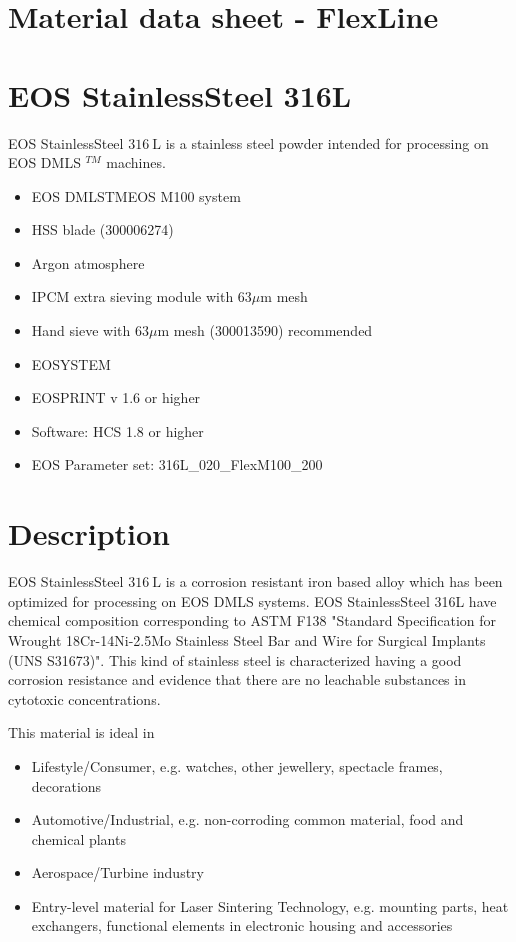 \documentclass[10pt]{article}
\begin{document}
\section*{Material data sheet - FlexLine}
\section*{EOS StainlessSteel 316L}
EOS StainlessSteel $316 \mathrm{~L}$ is a stainless steel powder intended for processing on EOS DMLS ${ }^{T M}$ machines.

\begin{itemize}
  \item EOS DMLSTMEOS M100 system
  \item HSS blade (300006274)
  \item Argon atmosphere
  \item IPCM extra sieving module with $63 \mu \mathrm{m}$ mesh
  \item Hand sieve with $63 \mu \mathrm{m}$ mesh (300013590) recommended
  \item EOSYSTEM
  \item EOSPRINT v 1.6 or higher
  \item Software: HCS 1.8 or higher
  \item EOS Parameter set: 316L\_020\_FlexM100\_200
\end{itemize}

\section*{Description}
EOS StainlessSteel $316 \mathrm{~L}$ is a corrosion resistant iron based alloy which has been optimized for processing on EOS DMLS systems. EOS StainlessSteel 316L have chemical composition corresponding to ASTM F138 "Standard Specification for Wrought 18Cr-14Ni-2.5Mo Stainless Steel Bar and Wire for Surgical Implants (UNS S31673)". This kind of stainless steel is characterized having a good corrosion resistance and evidence that there are no leachable substances in cytotoxic concentrations.

This material is ideal in

\begin{itemize}
  \item Lifestyle/Consumer, e.g. watches, other jewellery, spectacle frames, decorations
  \item Automotive/Industrial, e.g. non-corroding common material, food and chemical plants
  \item Aerospace/Turbine industry
  \item Entry-level material for Laser Sintering Technology, e.g. mounting parts, heat exchangers, functional elements in electronic housing and accessories
\end{itemize}
\end{document}
